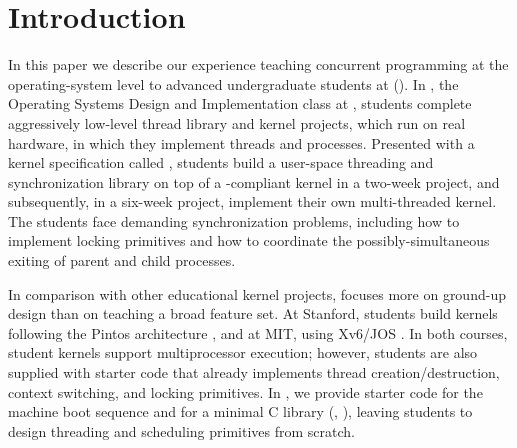 \section{Introduction}
\label{sec:intro}


In this paper we describe our experience teaching concurrent programming at the operating-system level to advanced undergraduate students at \carnegiemellon (\cmu).
In \fourten, the Operating Systems Design and Implementation class at \cmu,
students complete aggressively low-level thread library and kernel projects,
which run on real hardware,
in which they implement threads and processes.
Presented with a kernel specification called \pebbles%
, students build a user-space threading and synchronization library on top of a \pebbles-compliant kernel in a two-week project, and subsequently, in a six-week project, implement their own multi-threaded kernel.
The students face demanding synchronization problems, including how to implement locking primitives and how to coordinate the possibly-simultaneous exiting of parent and child processes.

In comparison with other educational kernel projects,
\pebbles focuses more on ground-up design than on teaching a broad feature set.
At Stanford, students build kernels following the Pintos architecture \cite{pintos}, and at MIT, using Xv6/JOS \cite{xv6}.
In both courses, student kernels support multiprocessor execution;
however, students are also supplied with starter code that already implements thread creation/destruction, context switching, and locking primitives.
In \fourten, we provide starter code for the machine boot sequence and for a minimal C library (, ), leaving students to design threading and scheduling primitives from scratch.

